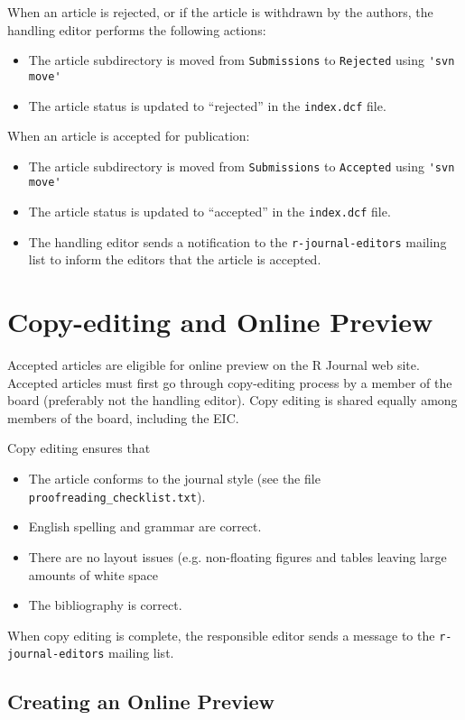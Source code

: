 \documentclass[11pt]{article}
\begin{document}
When an article is rejected, or if the article is withdrawn by the
authors, the handling editor performs the following actions:
\begin{itemize}
\item The article subdirectory is moved from \texttt{Submissions} to
  \texttt{Rejected} using \verb+'svn move'+
\item The article status is updated to ``rejected'' in the \texttt{index.dcf}
  file.
\end{itemize}
When an article is accepted for publication:
\begin{itemize}
\item The article subdirectory is moved from \texttt{Submissions} to
  \texttt{Accepted} using \verb+'svn move'+
\item The article status is updated to ``accepted'' in the \texttt{index.dcf}
  file.
\item The handling editor sends a notification to the \verb+r-journal-editors+
  mailing list to inform the editors that the article is accepted.
\end{itemize}

\section{Copy-editing and Online Preview}

Accepted articles are eligible for online preview on the R Journal web
site.  Accepted articles must first go through copy-editing process by
a member of the board (preferably not the handling editor). Copy
editing is shared equally among members of the board, including the
EIC.

Copy editing ensures that 
\begin{itemize}
\item The article conforms to the journal style (see the file
  \texttt{proofreading\_checklist.txt}).
\item English spelling and grammar are correct.
\item There are no layout issues (e.g. non-floating figures and tables
  leaving large amounts of white space
\item The bibliography is correct.
\end{itemize}
When copy editing is complete, the responsible editor sends a message
to the \verb+r-journal-editors+ mailing list.

\subsection{Creating an Online Preview}
\end{document}
